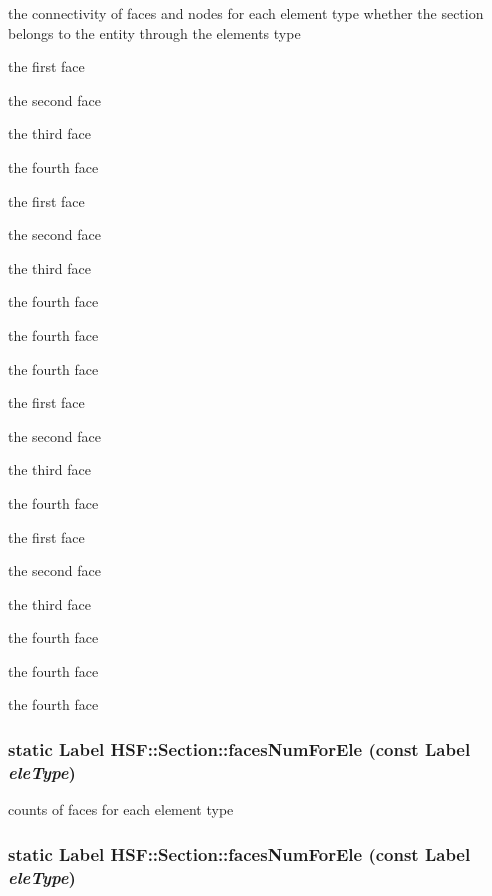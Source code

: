 the connectivity of faces and nodes for each element type whether the section belongs to the entity through the elements type 

the first face

the second face

the third face

the fourth face

the first face

the second face

the third face

the fourth face

the fourth face

the fourth face

the first face

the second face

the third face

the fourth face

the first face

the second face

the third face

the fourth face

the fourth face

the fourth face \hypertarget{classHSF_1_1Section_a44cf6f64b817e7126b03d4fda4b94b1a}{
\subsubsection[{facesNumForEle}]{\setlength{\rightskip}{0pt plus 5cm}static {\bf Label} HSF::Section::facesNumForEle (const {\bf Label} {\em eleType})}}
\label{classHSF_1_1Section_a44cf6f64b817e7126b03d4fda4b94b1a}


counts of faces for each element type \hypertarget{classHSF_1_1Section_a44cf6f64b817e7126b03d4fda4b94b1a}{
\subsubsection[{facesNumForEle}]{\setlength{\rightskip}{0pt plus 5cm}static {\bf Label} HSF::Section::facesNumForEle (const {\bf Label} {\em eleType})}}
\label{classHSF_1_1Section_a44cf6f64b817e7126b03d4fda4b94b1a}


